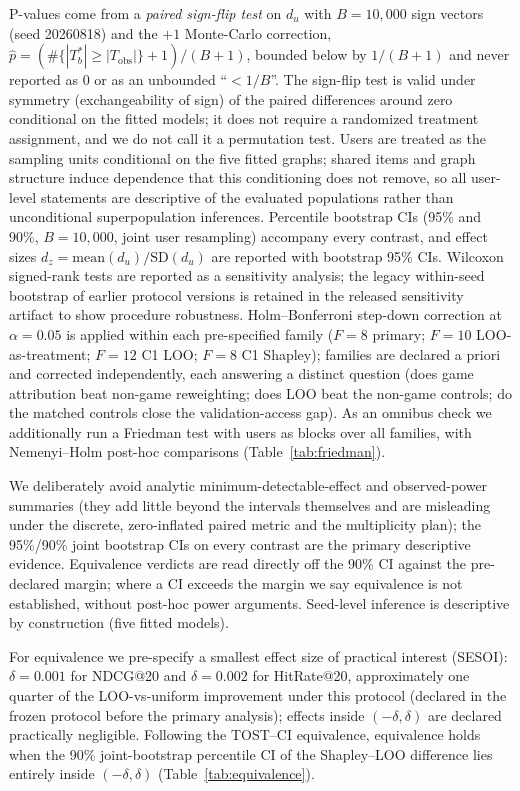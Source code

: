 \documentclass[pdflatex,sn-mathphys-num]{sn-jnl}
\begin{document}
P-values come from a \emph{paired sign-flip test} on $d_u$ with $B=10{,}000$ sign vectors (seed 20260818) and the $+1$ Monte-Carlo correction,
$\hat{p}=(\#\{|T^*_b|\ge|T_{\mathrm{obs}}|\}+1)/(B+1)$,
bounded below by $1/(B+1)$ and never reported as $0$ or as an unbounded ``$<1/B$''. The sign-flip test is valid under symmetry (exchangeability of sign) of the paired differences around zero conditional on the fitted models; it does not require a randomized treatment assignment, and we do not call it a permutation test. Users are treated as the sampling units conditional on the five fitted graphs; shared items and graph structure induce dependence that this conditioning does not remove, so all user-level statements are descriptive of the evaluated populations rather than unconditional superpopulation inferences. Percentile bootstrap CIs (95\% and 90\%, $B=10{,}000$, joint user resampling) accompany every contrast, and effect sizes $d_z=\mathrm{mean}(d_u)/\mathrm{SD}(d_u)$ are reported with bootstrap 95\% CIs. Wilcoxon signed-rank tests are reported as a sensitivity analysis; the legacy within-seed bootstrap of earlier protocol versions is retained in the released sensitivity artifact to show procedure robustness. Holm--Bonferroni step-down correction at $\alpha=0.05$ is applied within each pre-specified family ($F=8$ primary; $F=10$ LOO-as-treatment; $F=12$ C1 LOO; $F=8$ C1 Shapley); families are declared a priori and corrected independently, each answering a distinct question (does game attribution beat non-game reweighting; does LOO beat the non-game controls; do the matched controls close the validation-access gap). As an omnibus check we additionally run a Friedman test with users as blocks over all families, with Nemenyi--Holm post-hoc comparisons (Table~\ref{tab:friedman}).

We deliberately avoid analytic minimum-detectable-effect and observed-power summaries (they add little beyond the intervals themselves and are misleading under the discrete, zero-inflated paired metric and the multiplicity plan); the 95\%/90\% joint bootstrap CIs on every contrast are the primary descriptive evidence. Equivalence verdicts are read directly off the 90\% CI against the pre-declared margin; where a CI exceeds the margin we say equivalence is not established, without post-hoc power arguments. Seed-level inference is descriptive by construction (five fitted models).

For equivalence we pre-specify a smallest effect size of practical interest (SESOI): $\delta=0.001$ for NDCG@20 and $\delta=0.002$ for HitRate@20, approximately one quarter of the LOO-vs-uniform improvement under this protocol (declared in the frozen protocol before the primary analysis); effects inside $(-\delta,\delta)$ are declared practically negligible. Following the TOST--CI equivalence, equivalence holds when the 90\% joint-bootstrap percentile CI of the Shapley--LOO difference lies entirely inside $(-\delta,\delta)$ (Table~\ref{tab:equivalence}).
\end{document}
